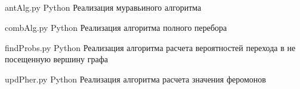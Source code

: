 \begin{appendices}
	\chapter{}
	
	{antAlg.py} %
	{Python} %
	{Реализация муравьиного алгоритма} %
	
	{combAlg.py} %
	{Python} %
	{Реализация алгоритма полного перебора} %
	
	
	{findProbs.py} %
	{Python} %
	{Реализация алгоритма расчета вероятностей перехода в не посещенную вершину графа} %
	
	{updPher.py} %
	{Python} %
	{Реализация алгоритма расчета значения феромонов} %
	
	
	
	
 
\end{appendices}
